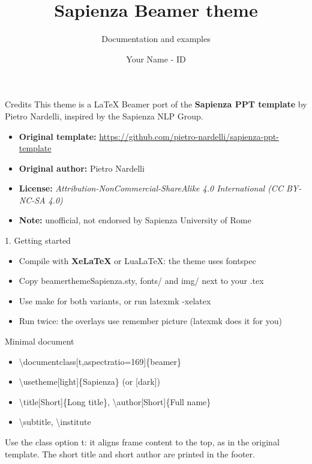 \documentclass[t,aspectratio=169]{beamer}
\title[Sapienza Beamer Theme]{Sapienza Beamer theme}
\subtitle{Documentation and examples}
\author[Your Name]{Your Name - ID}
\institute{Sapienza University of Rome}
\date{}
\newcommand{\code}[1]{{\ttfamily\small #1}}
\begin{document}
\begin{frame}[plain]\titlepage\end{frame}

\begin{frame}{Credits}
  This theme is a LaTeX Beamer port of the \textbf{Sapienza PPT template} by Pietro Nardelli,
  inspired by the Sapienza NLP Group.
  \vspace{0.8em}
  \begin{itemize}
    \item \textbf{Original template:} \url{https://github.com/pietro-nardelli/sapienza-ppt-template}
    \item \textbf{Original author:} Pietro Nardelli
    \item \textbf{License:} {\itshape Attribution-NonCommercial-ShareAlike 4.0 International (CC BY-NC-SA 4.0)}
    \item \textbf{Note:} unofficial, not endorsed by Sapienza University of Rome
  \end{itemize}
\end{frame}

\begin{frame}[plain]
\end{frame}

\begin{frame}{1. Getting started}
  \begin{itemize}
    \item Compile with \textbf{XeLaTeX} or LuaLaTeX: the theme uses \code{fontspec}
    \item Copy \code{beamerthemeSapienza.sty}, \code{fonts/} and \code{img/} next to your \code{.tex}
    \item Use \code{make} for both variants, or run \code{latexmk -xelatex}
    \item Run twice: the overlays use \code{remember picture} (latexmk does it for you)
  \end{itemize}
\end{frame}

\begin{frame}{Minimal document}
  \small
  \begin{itemize}
    \item \code{\textbackslash documentclass[t,aspectratio=169]\{beamer\}}
    \item \code{\textbackslash usetheme[light]\{Sapienza\}} \hfill (or \code{[dark]})
    \item \code{\textbackslash title[Short]\{Long title\}}, \code{\textbackslash author[Short]\{Full name\}}
    \item \code{\textbackslash subtitle}, \code{\textbackslash institute}
  \end{itemize}
  \vspace{0.6em}
  Use the class option \code{t}: it aligns frame content to the top, as in the original template.
  The short title and short author are printed in the footer.
\end{frame}
\end{document}
